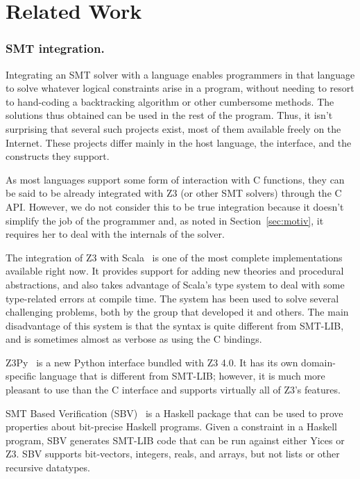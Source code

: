 \section{Related Work}

\subsubsection{SMT integration.}

Integrating an SMT solver with a language enables programmers in that language
to solve whatever logical constraints arise in a program, without needing to
resort to hand-coding a backtracking algorithm or other cumbersome methods.
The solutions thus obtained can be used in the rest of the program. Thus, it
isn't surprising that several such projects exist, most of them available
freely on the Internet. These projects differ mainly in the host language, the
interface, and the constructs they support.

As most languages support some form of interaction with C functions, they can
be said to be already integrated with Z3 (or other SMT solvers) through the C
API. However, we do not consider this to be true integration because it
doesn't simplify the job of the programmer and, as noted in
Section~\ref{sec:motiv}, it requires her to deal with the internals of the
solver.

The integration of Z3 with Scala~\cite{scalaz3} is one of the most complete
implementations available right now. It provides support for adding new
theories and procedural abstractions, and also takes advantage of Scala's type
system to deal with some type-related errors at compile time.  The system has
been used to solve several challenging problems, both by the group that
developed it and others. The main disadvantage of this system is that the
syntax is quite different from SMT-LIB, and is sometimes almost as verbose as
using the C bindings.

Z3Py~\cite{z3py} is a new Python interface bundled with Z3 4.0. It has its own
domain-specific language that is different from SMT-LIB; however, it is
much more pleasant to use than the C interface and supports virtually all of
Z3's features.

SMT Based Verification (SBV)~\cite{sbv} is a Haskell package that can be used
to prove properties about bit-precise Haskell programs. Given a constraint in
a Haskell program, SBV generates SMT-LIB code that can be run against either
Yices or Z3. SBV supports bit-vectors, integers, reals, and arrays, but not
lists or other recursive datatypes.

